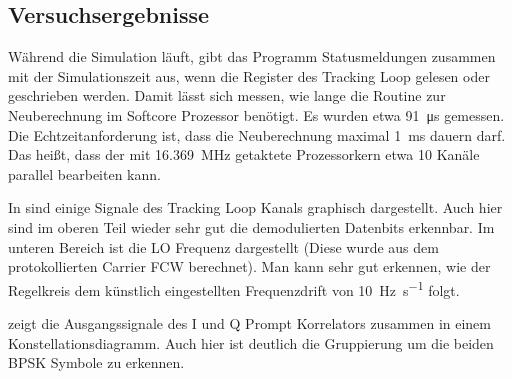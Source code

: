 \subsection{Versuchsergebnisse}
Während die Simulation läuft, gibt das Programm Statusmeldungen zusammen mit der Simulationszeit aus, wenn die Register des Tracking Loop gelesen oder geschrieben werden. Damit lässt sich messen, wie lange die Routine zur Neuberechnung im Softcore Prozessor benötigt. Es wurden etwa \SI{91}{\micro\second} gemessen. Die Echtzeitanforderung ist, dass die Neuberechnung maximal \SI{1}{\milli\second} dauern darf. Das heißt, dass der mit \SI{16.369}{\mega\hertz} getaktete Prozessorkern etwa 10 Kanäle parallel bearbeiten kann.

In  sind einige Signale des Tracking Loop Kanals graphisch dargestellt. Auch hier sind im oberen Teil wieder sehr gut die demodulierten Datenbits erkennbar. Im unteren Bereich ist die LO Frequenz dargestellt (Diese wurde aus dem protokollierten Carrier FCW berechnet). Man kann sehr gut erkennen, wie der Regelkreis dem künstlich eingestellten Frequenzdrift von \SI{10}{\hertz\per\second} folgt.

 zeigt die Ausgangssignale des I und Q Prompt Korrelators zusammen in einem Konstellationsdiagramm. Auch hier ist deutlich die Gruppierung um die beiden BPSK Symbole zu erkennen.


